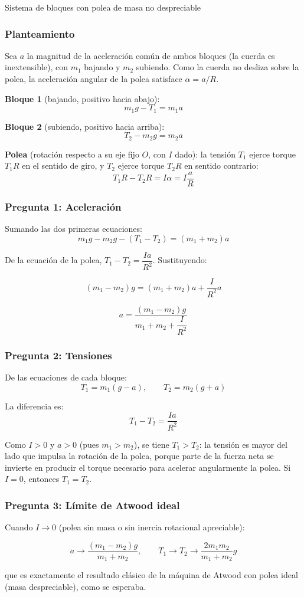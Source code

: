 \begin{solucion}{Sistema de bloques con polea de masa no despreciable}
\subsubsection*{Planteamiento}

Sea $a$ la magnitud de la aceleración común de ambos bloques (la cuerda es inextensible), con $m_1$ bajando y $m_2$ subiendo. Como la cuerda no desliza sobre la polea, la aceleración angular de la polea satisface $\alpha = a/R$.

\textbf{Bloque 1} (bajando, positivo hacia abajo):
$$m_1 g - T_1 = m_1 a$$

\textbf{Bloque 2} (subiendo, positivo hacia arriba):
$$T_2 - m_2 g = m_2 a$$

\textbf{Polea} (rotación respecto a su eje fijo $O$, con $I$ dado): la tensión $T_1$ ejerce torque $T_1 R$ en el sentido de giro, y $T_2$ ejerce torque $T_2 R$ en sentido contrario:
$$T_1 R - T_2 R = I\alpha = I\frac{a}{R}$$

\subsubsection*{Pregunta 1: Aceleración}

Sumando las dos primeras ecuaciones:
$$m_1 g - m_2 g - (T_1 - T_2) = (m_1+m_2)a$$

De la ecuación de la polea, $T_1 - T_2 = \dfrac{Ia}{R^2}$. Sustituyendo:

$$(m_1 - m_2)g = (m_1+m_2)a + \frac{I}{R^2}a$$

$$\boxed{a = \frac{(m_1-m_2)g}{m_1+m_2+\dfrac{I}{R^2}}}$$

\subsubsection*{Pregunta 2: Tensiones}

De las ecuaciones de cada bloque:
$$\boxed{T_1 = m_1(g-a)}, \qquad \boxed{T_2 = m_2(g+a)}$$

La diferencia es:
$$T_1 - T_2 = \frac{Ia}{R^2}$$

Como $I > 0$ y $a > 0$ (pues $m_1 > m_2$), se tiene $T_1 > T_2$: la tensión es mayor del lado que impulsa la rotación de la polea, porque parte de la fuerza neta se invierte en producir el torque necesario para acelerar angularmente la polea. Si $I = 0$, entonces $T_1 = T_2$.

\subsubsection*{Pregunta 3: Límite de Atwood ideal}

Cuando $I \to 0$ (polea sin masa o sin inercia rotacional apreciable):

$$a \to \frac{(m_1-m_2)g}{m_1+m_2}, \qquad T_1 \to T_2 \to \frac{2m_1m_2}{m_1+m_2}g$$

que es exactamente el resultado clásico de la máquina de Atwood con polea ideal (masa despreciable), como se esperaba.
\end{solucion}
